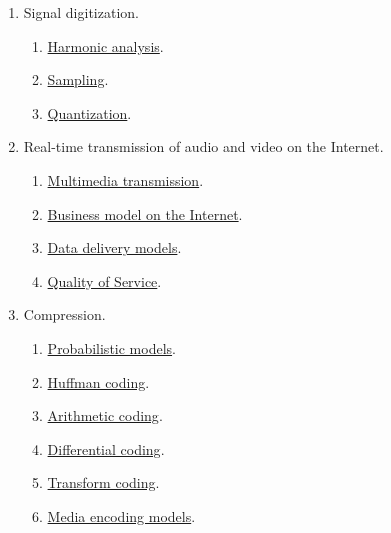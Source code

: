 \begin{enumerate}
\item Signal digitization.
  \begin{enumerate}               
  \item \href{https://vicente-gonzalez-ruiz.github.io/harmonic_analysis/}{Harmonic analysis}.
  \item \href{https://vicente-gonzalez-ruiz.github.io/sampling/}{Sampling}.
  \item \href{https://vicente-gonzalez-ruiz.github.io/quantization/}{Quantization}.
  \end{enumerate}
  
\item Real-time transmission of audio and video on the Internet.
  \begin{enumerate}
  \item \href{(https://cdn.rawgit.com/vicente-gonzalez-ruiz/multimedia_transmission/master/index.html}{Multimedia transmission}.
  \item \href{https://cdn.rawgit.com/vicente-gonzalez-ruiz/Intenet_business_model/master/index.html}{Business model on the Internet}.
  \item \href{https://cdn.rawgit.com/vicente-gonzalez-ruiz/data_delivery_models/master/index.html}{Data delivery models}.
  \item \href{https://cdn.rawgit.com/vicente-gonzalez-ruiz/quality_of_service/master/index.html}{Quality of Service}.
  \end{enumerate}
  
\item Compression.
  \begin{enumerate}
  \item \href{https://cdn.rawgit.com/vicente-gonzalez-ruiz/Probabilistic_Models/master/index.html}{Probabilistic models}.
  \item \href{https://rawgit.com/vicente-gonzalez-ruiz/Huffman_Coding/master/index.html}{Huffman coding}.
  \item \href{https://cdn.rawgit.com/vicente-gonzalez-ruiz/Arithmetic_Coding/master/index.html}{Arithmetic coding}.
  \item \href{https://cdn.rawgit.com/vicente-gonzalez-ruiz/differential_coding/master/index.html}{Differential coding}.
  \item \href{https://cdn.rawgit.com/vicente-gonzalez-ruiz/transform_coding/master/index.html}{Transform coding}.
  \item \href{https://cdn.rawgit.com/vicente-gonzalez-ruiz/media_encoding_models/master/index.html}{Media encoding models}.
  \end{enumerate}

\end{enumerate}

%

